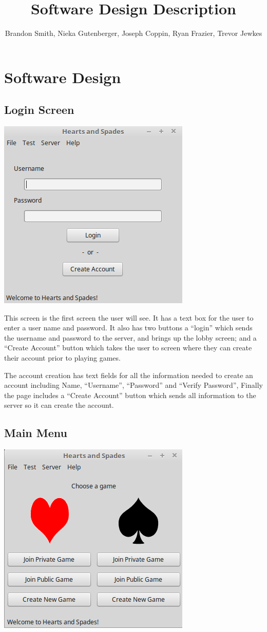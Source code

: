 \documentclass[]{scrartcl}
\title{Software Design Description}
\author{Brandon Smith, Nieka Gutenberger, Joseph Coppin, Ryan Frazier, Trevor Jewkes}
\begin{document}
\maketitle
\pagebreak
\section{Software Design}
\subsection{Login Screen}

\centerline{\includegraphics{LoginScreen.png}}

This screen is the first screen the user will see.  It has a text box for the user to enter a user name and password.  It also has two buttons a “login” which sends the username and password to the server, and brings up the lobby screen; and a “Create Account” button which takes the user to screen where they can create their account prior to playing games.

The account creation has text fields for all the information needed to create an account including Name, “Username”, “Password”  and “Verify Password”,  Finally the page includes a “Create Account” button which sends all information to the server so it can create the account.

\subsection{Main Menu}
\centerline{\includegraphics{SelectGame.png}}
\end{document}
